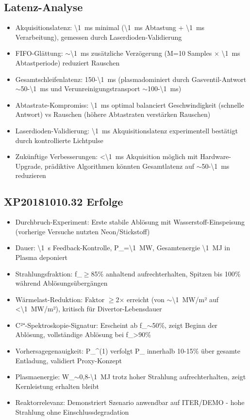 \documentclass[11pt,a4paper]{article}
\begin{document}
\subsection{Latenz-Analyse}

\begin{itemize}
\item Akquisitionslatenz: \SI{\1}{m}s minimal (\SI{\1}{m}s Abtastung + \SI{\1}{m}s Verarbeitung), gemessen durch Laserdioden-Validierung
\item FIFO-Glättung: $\sim$\SI{\1}{m}s zusätzliche Verzögerung (M=10 Samples $\times$ \SI{\1}{m}s Abtastperiode) reduziert Rauschen
\item Gesamtschleifenlatenz: 150-\SI{\1}{m}s (plasmadominiert durch Gasventil-Antwort $\sim$50-\SI{\1}{m}s und Verunreinigungstransport $\sim$100-\SI{\1}{m}s)
\item Abtastrate-Kompromiss: \SI{\1}{m}s optimal balanciert Geschwindigkeit (schnelle Antwort) vs Rauschen (höhere Abtastraten verstärken Rauschen)
\item Laserdioden-Validierung: \SI{\1}{m}s Akquisitionslatenz experimentell bestätigt durch kontrollierte Lichtpulse
\item Zukünftige Verbesserungen: <\SI{\1}{m}s Akquisition möglich mit Hardware-Upgrade, prädiktive Algorithmen könnten Gesamtlatenz auf $\sim$50-\SI{\1}{m}s reduzieren
\end{itemize}

\subsection{XP20181010.32 Erfolge}

\begin{itemize}
\item Durchbruch-Experiment: Erste stabile Ablösung mit Wasserstoff-Einspeisung (vorherige Versuche nutzten Neon/Stickstoff)
\item Dauer: \SI{\1}{s} Feedback-Kontrolle, P_{}=\SI{\1}{MW}, Gesamtenergie \SI{\1}{MJ} in Plasma deponiert
\item Strahlungsfraktion: f_{}$\geq$85\% anhaltend aufrechterhalten, Spitzen bis 100\% während Ablösungsübergängen
\item Wärmelast-Reduktion: Faktor $\geq$2$\times$ erreicht (von $\sim$\SI{\1}{MW}/m² auf <\SI{\1}{MW}/m²), kritisch für Divertor-Lebensdauer
\item C²⁺-Spektroskopie-Signatur: Erscheint ab f_{}$\sim$50\%, zeigt Beginn der Ablösung, vollständige Ablösung bei f_{}>90\%
\item Vorhersagegenauigkeit: P_{}^(1) verfolgt P_{} innerhalb 10-15\% über gesamte Entladung, validiert Proxy-Konzept
\item Plasmaenergie: W_{}$\sim$0,8-\SI{\1}{MJ} trotz hoher Strahlung aufrechterhalten, zeigt Kernleistung erhalten bleibt
\item Reaktorrelevanz: Demonstriert Szenario anwendbar auf ITER/DEMO - hohe Strahlung ohne Einschlussdegradation
\end{itemize}
\end{document}
